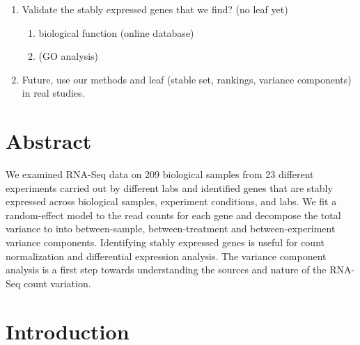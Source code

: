\documentclass[11pt, a4paper]{article}
\begin{document}
\begin{enumerate}
    \item
	Validate the stably expressed genes that we find? (no leaf yet) 
	\begin{enumerate}
	    \item
		biological function (online database) 
	    \item
		(GO analysis)
	\end{enumerate}

    \item
	Future, use our methods and leaf (stable set, rankings, variance
	components) in real studies.
\end{enumerate}

\newpage
\maketitle

\section*{Abstract}
We examined RNA-Seq data on 209 biological samples from 23 different
experiments carried out by different labs and identified genes that are stably
expressed across biological samples, experiment conditions, and labs. We fit a
random-effect model to the read counts for each gene and decompose the total
variance to into between-sample, between-treatment and between-experiment variance
components. Identifying stably expressed genes is useful for count
normalization and differential expression analysis. The variance component analysis is a first step towards
understanding the sources and nature of the RNA-Seq count variation.


\section{Introduction}\label{section:Introduction}
\end{document}

